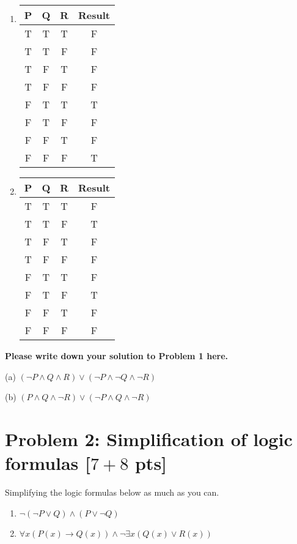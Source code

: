 \documentclass[11pt,twoside]{article}
\newcommand{\problem}[1]{\section*{Problem #1}}
\newenvironment{solution}{{\par\noindent\it Solution.}}{}
\begin{document}
\begin{enumerate}
\item
\begin{center}
\begin{tabular}{|c|c|c|c|}
\hline
P & Q & R & Result \\
\hline
T & T & T & F \\
\hline
T & T & F & F \\
\hline
T & F & T & F \\
\hline
T & F & F & F \\
\hline
F & T & T & T \\
\hline
F & T & F & F \\
\hline
F & F & T & F \\
\hline
F & F & F & T \\
\hline
\end{tabular}
\end{center}


\item
\begin{center}
\begin{tabular}{|c|c|c|c|}
\hline
P & Q & R & Result  \\
\hline
T & T & T & F \\
\hline
T & T & F & T \\
\hline
T & F & T & F \\
\hline
T & F & F & F \\
\hline
F & T & T & F \\
\hline
F & T & F & T \\
\hline
F & F & T & F \\
\hline
F & F & F & F \\
\hline
\end{tabular}
\end{center}

\end{enumerate}
\begin{solution}
\textbf{Please write down your solution to Problem 1 here.}

(a) $(\neg P \land Q \land R)\lor(\neg P \land \neg Q \land \neg R) $

(b) $(P \land Q \land \neg R)\lor(\neg P \land Q \land \neg R) $
 
\end{solution}

\problem{2: Simplification of logic formulas [$7+8$ pts]}
Simplifying the logic formulas below as much as you can.

\begin{enumerate}
\item $\neg (\neg P \lor Q) \land (P \lor \neg Q)$

\item $\forall x (P(x) \rightarrow Q(x)) \land \neg \exists x (Q(x) \lor R(x)) $

\end{enumerate}
\end{document}
